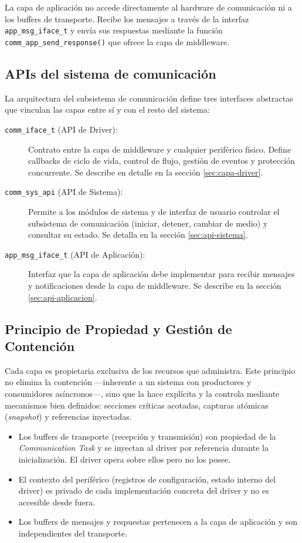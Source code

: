 La capa de aplicación no accede directamente al hardware de comunicación ni a los buffers de transporte. Recibe los mensajes a través de la interfaz \texttt{app\_msg\_iface\_t} y envía sus respuestas mediante la función \texttt{comm\_app\_send\_response()} que ofrece la capa de middleware.

\subsection{APIs del sistema de comunicación}
\label{subsec:apis-del-sistema}

La arquitectura del subsistema de comunicación define tres interfaces abstractas que vinculan las capas entre sí y con el resto del sistema:

\begin{description}
    \item[\texttt{comm\_iface\_t} (API de Driver):] Contrato entre la capa de middleware y cualquier periférico físico. Define callbacks de ciclo de
          vida, control de flujo, gestión de eventos y protección concurrente. Se describe en detalle en la sección \ref{sec:capa-driver}.
    \item[\texttt{comm\_sys\_api} (API de Sistema):] Permite a los módulos de sistema y de interfaz de usuario controlar el subsistema de comunicación
          (iniciar, detener, cambiar de medio) y consultar su estado. Se detalla en la sección \ref{sec:api-sistema}.
    \item[\texttt{app\_msg\_iface\_t} (API de Aplicación):] Interfaz que la capa de aplicación debe implementar para recibir mensajes y notificaciones desde la capa de middleware. Se describe en la sección
          \ref{sec:api-aplicacion}.
\end{description}

\subsection{Principio de Propiedad y Gestión de Contención}
\label{subsec:propiedad-contencion}

Cada capa es propietaria exclusiva de los recursos que administra. Este principio no elimina la contención —inherente a un sistema con productores y consumidores asíncronos—, sino que la hace explícita y la controla mediante mecanismos bien definidos: secciones críticas acotadas, capturas atómicas (\textit{snapshot}) y referencias inyectadas.

\begin{itemize}
    \item Los buffers de transporte (recepción y transmisión) son propiedad de la \textit{Communication Task} y se inyectan al driver por referencia durante
          la inicialización. El driver opera sobre ellos pero no los posee.
    \item El contexto del periférico (registros de configuración, estado interno del driver) es privado de cada implementación concreta del driver y no es accesible desde fuera.
    \item Los buffers de mensajes y respuestas pertenecen a la capa de aplicación y son independientes del transporte.
\end{itemize}

